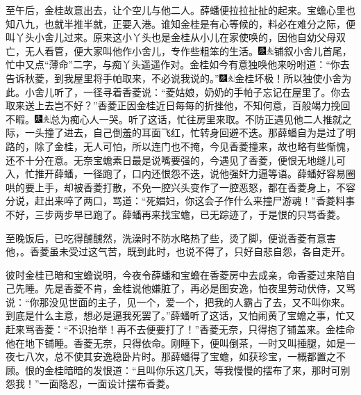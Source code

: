 至午后，金桂故意出去，让个空儿与他二人。薛蟠便拉拉扯扯的起来。宝蟾心里也知八九，也就半推半就，正要入港。谁知金桂是有心等候的，料必在难分之际，便叫丫头小舍儿过来。原来这小丫头也是金桂从小儿在家使唤的，因他自幼父母双亡，无人看管，便大家叫他作小舍儿，专作些粗笨的生活。{\includegraphics[width=3mm]{../Images/00004}\includegraphics[width=3mm]{../Images/00012}\footnotesize \kaishu 铺叙小舍儿首尾，忙中又点``薄命''二字，与痴丫头遥遥作对。}金桂如今有意独唤他来吩咐道：``你去告诉秋菱，到我屋里将手帕取来，不必说我说的。''{\includegraphics[width=3mm]{../Images/00004}\includegraphics[width=3mm]{../Images/00012}\footnotesize \kaishu 金桂坏极！所以独使小舍为此。}小舍儿听了，一径寻着香菱说：``菱姑娘，奶奶的手帕子忘记在屋里了。你去取来送上去岂不好？''香菱正因金桂近日每每的折挫他，不知何意，百般竭力挽回不暇。{\includegraphics[width=3mm]{../Images/00004}\includegraphics[width=3mm]{../Images/00012}\footnotesize \kaishu 总为痴心人一哭。}听了这话，忙往房里来取。不防正遇见他二人推就之际，一头撞了进去，自己倒羞的耳面飞红，忙转身回避不迭。那薛蟠自为是过了明路的，除了金桂，无人可怕，所以连门也不掩，今见香菱撞来，故也略有些惭愧，还不十分在意。无奈宝蟾素日最是说嘴要强的，今遇见了香菱，便恨无地缝儿可入，忙推开薛蟠，一径跑了，口内还恨怨不迭，说他强奸力逼等语。薛蟠好容易圈哄的要上手，却被香菱打散，不免一腔兴头变作了一腔恶怒，都在香菱身上，不容分说，赶出来啐了两口，骂道：``死娼妇，你这会子作什么来撞尸游魂！''香菱料事不好，三步两步早已跑了。薛蟠再来找宝蟾，已无踪迹了，于是恨的只骂香菱。

至晚饭后，已吃得醺醺然，洗澡时不防水略热了些，烫了脚，便说香菱有意害他，。香菱虽未受过这气苦，既到此时，也说不得了，只好自悲自怨，各自走开。

彼时金桂已暗和宝蟾说明，今夜令薛蟠和宝蟾在香菱房中去成亲，命香菱过来陪自己先睡。先是香菱不肯，金桂说他嫌脏了，再必是图安逸，怕夜里劳动伏侍，又骂说：``你那没见世面的主子，见一个，爱一个，把我的人霸占了去，又不叫你来。到底是什么主意，想必是逼我死罢了。''薛蟠听了这话，又怕闹黄了宝蟾之事，忙又赶来骂香菱：``不识抬举！再不去便要打了！''香菱无奈，只得抱了铺盖来。金桂命他在地下铺睡。香菱无奈，只得依命。刚睡下，便叫倒茶，一时又叫捶腿，如是一夜七八次，总不使其安逸稳卧片时。那薛蟠得了宝蟾，如获珍宝，一概都置之不顾。恨的金桂暗暗的发恨道：``且叫你乐这几天，等我慢慢的摆布了来，那时可别怨我！''一面隐忍，一面设计摆布香菱。

